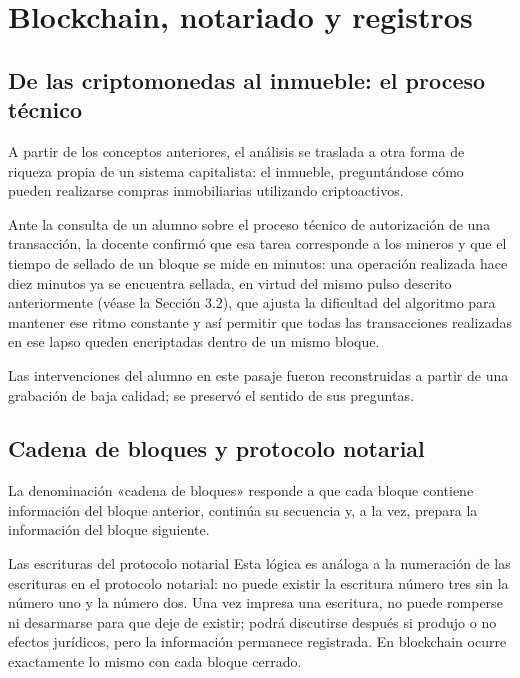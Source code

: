 \documentclass[12pt,oneside]{book}
\begin{document}
\chapter{Blockchain, notariado y registros}

\section{De las criptomonedas al inmueble: el proceso técnico}

A partir de los conceptos anteriores, el análisis se traslada a otra forma de riqueza propia de un sistema capitalista: el inmueble, preguntándose cómo pueden realizarse compras inmobiliarias utilizando criptoactivos.

Ante la consulta de un alumno sobre el proceso técnico de autorización de una transacción, la docente confirmó que esa tarea corresponde a los mineros y que el tiempo de sellado de un bloque se mide en minutos: una operación realizada hace diez minutos ya se encuentra sellada, en virtud del mismo pulso descrito anteriormente (véase la Sección 3.2), que ajusta la dificultad del algoritmo para mantener ese ritmo constante y así permitir que todas las transacciones realizadas en ese lapso queden encriptadas dentro de un mismo bloque.

\begin{note}
Las intervenciones del alumno en este pasaje fueron reconstruidas a partir de una grabación de baja calidad; se preservó el sentido de sus preguntas.
\end{note}

\section{Cadena de bloques y protocolo notarial}

La denominación «cadena de bloques» responde a que cada bloque contiene información del bloque anterior, continúa su secuencia y, a la vez, prepara la información del bloque siguiente.

\begin{example}{Las escrituras del protocolo notarial}
Esta lógica es análoga a la numeración de las escrituras en el protocolo notarial: no puede existir la escritura número tres sin la número uno y la número dos. Una vez impresa una escritura, no puede romperse ni desarmarse para que deje de existir; podrá discutirse después si produjo o no efectos jurídicos, pero la información permanece registrada. En blockchain ocurre exactamente lo mismo con cada bloque cerrado.
\end{example}
\end{document}
